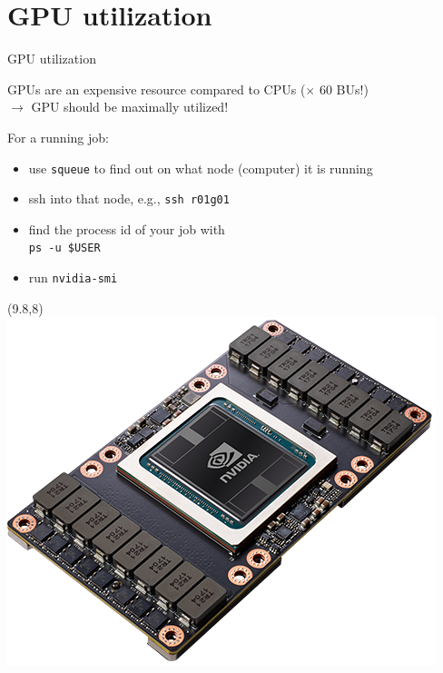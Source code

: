 \documentclass[aspectratio=1610,14pt]{beamer}
\begin{document}
\section{GPU utilization}

\begin{frame}{GPU utilization}

GPUs are an expensive resource compared to CPUs ($\times$ 60 BUs!) \\
$\rightarrow$ GPU should be maximally utilized!

\vspace{1em}

\begin{minipage}{0.8\textwidth}
For a running job:
\begin{itemize}
\item use {\tt squeue} to find out on what node (computer) it is running
\item ssh into that node, e.g., {\tt ssh r01g01}
\item find the process id of your job with \\
  {\tt ps -u \$USER }
\item run {\tt nvidia-smi}
\end{itemize}
\end{minipage}

\begin{textblock}{6}(9.8,8)
  \includegraphics[width=\textwidth]{v100}
\end{textblock}
\end{frame}
\end{document}
